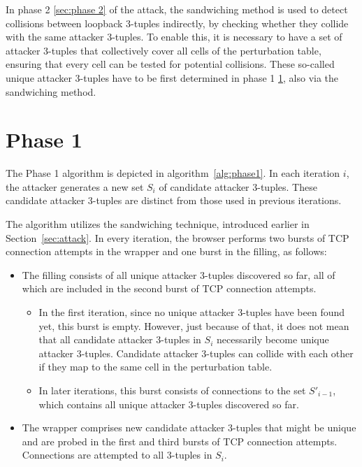 \documentclass{report}
\begin{document}
In phase 2 \ref{sec:phase 2} of the attack, the sandwiching method is used to detect collisions between loopback 3-tuples indirectly, by checking whether they collide with the same attacker 3-tuples. To enable this, it is necessary to have a set of attacker 3-tuples that collectively cover all cells of the perturbation table, ensuring that every cell can be tested for potential collisions. These so-called \alert{unique attacker 3-tuples} have to be first determined in phase 1 \ref{sec:phase 1}, also via the sandwiching method.

\section{Phase 1}
\label{sec:phase 1}

The Phase 1 algorithm is depicted in algorithm~\ref{alg:phase1}. In each iteration $i$, the attacker generates a new set $S_i$ of \alert{candidate attacker 3-tuples}. These candidate attacker 3-tuples are distinct from those used in previous iterations.

The algorithm utilizes the \alert{sandwiching technique}, introduced earlier in Section~\ref{sec:attack}. In every iteration, the browser performs two bursts of TCP connection attempts in the wrapper and one burst in the filling, as follows:
\begin{itemize}
	\item The \alert{filling} consists of all \alert{unique attacker 3-tuples} discovered so far, all of which are included in the second burst of TCP connection attempts.
	\begin{itemize}
		\item In the first iteration, since no unique attacker 3-tuples have been found yet, this burst is \alert{empty}. However, just because of that, it does not mean that all candidate attacker 3-tuples in $S_i$ necessarily become unique attacker 3-tuples. Candidate attacker 3-tuples \alert{can collide with each other} if they map to the same cell in the perturbation table.
		\item In later iterations, this burst consists of connections to the set $S'_{i-1}$, which contains \alert{all unique attacker 3-tuples discovered so far}.
	\end{itemize}
	\item The \alert{wrapper} comprises new candidate attacker 3-tuples that might be unique and are probed in the first and third bursts of TCP connection attempts. Connections are attempted to all 3-tuples in $S_i$.
\end{itemize}
\end{document}
